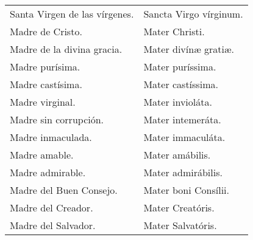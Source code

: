 \documentclass[./rosary.tex]{subfiles}
\begin{document}
\begin{longtable} { p{} p{} }
    Santa Virgen de las vírgenes.                                                                                            & Sancta Virgo vírginum.                       \\
    Madre de Cristo.                                                                                                         & Mater Christi.                               \\
    Madre de la divina gracia.                                                                                               & Mater divínæ gratiæ.                         \\
    Madre purísima.                                                                                                          & Mater puríssima.                             \\
    Madre castísima.                                                                                                         & Mater castíssima.                            \\
    Madre virginal.                                                                                                          & Mater invioláta.                             \\
    Madre sin corrupción.                                                                                                    & Mater intemeráta.                            \\
    Madre inmaculada.                                                                                                        & Mater immaculáta.                            \\
    Madre amable.                                                                                                            & Mater amábilis.                              \\
    Madre admirable.                                                                                                         & Mater admirábilis.                           \\
    Madre del Buen Consejo.                                                                                                  & Mater boni Consílii.                         \\
    Madre del Creador.                                                                                                       & Mater Creatóris.                             \\
    Madre del Salvador.                                                                                                      & Mater Salvatóris.                            \\

\end{longtable}
\end{document}
